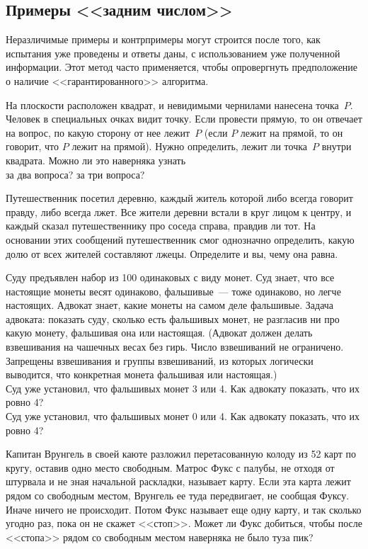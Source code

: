 \subsection*{Примеры <<задним числом>>}
Неразличимые примеры и контрпримеры могут строится после того, как испытания
уже проведены и ответы даны, с использованием уже полученной информации.
Этот метод часто применяется, чтобы опровергнуть предположение о наличие
<<гарантированного>> алгоритма.

\begin{problems}

\item
На плоскости расположен квадрат, и невидимыми чернилами нанесена точка~$P$.
Человек в специальных очках видит точку.
Если провести прямую, то он отвечает на вопрос, по какую сторону от нее
лежит~$P$ (если $P$ лежит на прямой, то он говорит, что $P$ лежит на прямой).
Нужно определить, лежит ли точка~$P$ внутри квадрата.
Можно ли это наверняка узнать
\\
\subproblem за два вопроса?
\qquad
\subproblem за три вопроса?

\item
Путешественник посетил деревню, каждый житель которой либо всегда говорит
правду, либо всегда лжет.
Все жители деревни встали в круг лицом к центру, и каждый сказал
путешественнику про соседа справа, правдив ли тот.
На основании этих сообщений путешественник смог однозначно определить, какую
долю от всех жителей составляют лжецы.
Определите и вы, чему она равна.

\item
Суду предъявлен набор из 100 одинаковых с виду монет.
Суд знает, что все настоящие монеты весят одинаково, фальшивые~--- тоже
одинаково, но легче настоящих.
Адвокат знает, какие монеты на самом деле фальшивые.
Задача адвоката: показать суду, сколько есть фальшивых монет, не разгласив
ни про какую монету, фальшивая она или настоящая.
(Адвокат должен делать взвешивания на чашечных весах без гирь.
Число взвешиваний не ограничено.
Запрещены взвешивания и группы взвешиваний, из которых логически выводится, что
конкретная монета фальшивая или настоящая.)
\\
\subproblem
Суд уже установил, что фальшивых монет 3 или 4.
Как адвокату показать, что их ровно 4?
\\
\subproblem
Суд уже установил, что фальшивых монет 0 или 4.
Как адвокату показать, что их ровно 4?

\item
Капитан Врунгель в своей каюте разложил перетасованную колоду из 52 карт
по кругу, оставив одно место свободным.
Матрос Фукс с палубы, не отходя от штурвала и не зная начальной раскладки,
называет карту.
Если эта карта лежит рядом со свободным местом, Врунгель ее туда передвигает,
не сообщая Фуксу.
Иначе ничего не происходит.
Потом Фукс называет еще одну карту, и так сколько угодно раз, пока он не скажет
<<стоп>>.
Может ли Фукс добиться, чтобы после <<стопа>> рядом со свободным местом
наверняка не было туза пик?

\end{problems}

